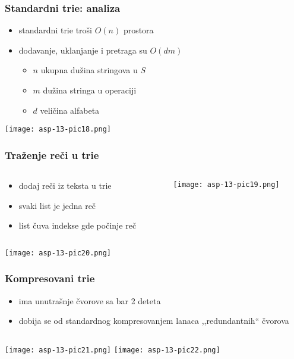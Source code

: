 \documentclass[compress,aspectratio=169]{beamer}
\begin{document}
\begin{frame}[fragile]
  \frametitle{Standardni trie: analiza}
  \begin{itemize}
    \item standardni trie troši $O(n)$ prostora
    \item dodavanje, uklanjanje i pretraga su $O(dm)$
    \begin{itemize}
      \item $n$ ukupna dužina stringova u $S$
      \item $m$ dužina stringa u operaciji
      \item $d$ veličina alfabeta
    \end{itemize}
  \end{itemize}
  \begin{center}
    \texttt{[image: asp-13-pic18.png]}
  \end{center}
\end{frame}

\begin{frame}[fragile]
  \frametitle{Traženje reči u trie}
  \begin{columns}
    \begin{column}[t]{4cm}
      {\footnotesize
      \begin{itemize}
        \item dodaj reči iz teksta u trie
        \item svaki list je jedna reč
        \item list čuva indekse gde počinje reč
      \end{itemize}}
    \end{column}
    \begin{column}[t]{8cm}
      \begin{center}
        \texttt{[image: asp-13-pic19.png]}
      \end{center}
    \end{column}
  \end{columns}
  \begin{center}
    \texttt{[image: asp-13-pic20.png]}
  \end{center}
\end{frame}

\begin{frame}[fragile]
  \frametitle{Kompresovani trie}
  \begin{itemize}
    \item {} ima unutrašnje čvorove sa bar 2 deteta
    \item dobija se od standardnog kompresovanjem lanaca ,,redundantnih`` čvorova
  \end{itemize}
  \begin{columns}
    \column{10cm}
      \texttt{[image: asp-13-pic21.png]}
    \column{6cm}
      \texttt{[image: asp-13-pic22.png]}
  \end{columns}
\end{frame}
\end{document}
